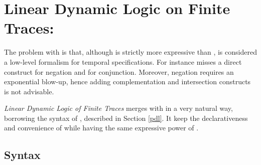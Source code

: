\section{Linear Dynamic Logic on Finite Traces: \LDLf}
The problem with \RE is that, although is strictly more expressive than \LTLf, is considered a low-level formalism for temporal specifications. For instance \RE misses a direct construct for negation and for conjunction. Moreover, negation requires an exponential blow-up, hence adding complementation and intersection constructs is not advisable.

\emph{Linear Dynamic Logic of Finite Traces} \LDLf \citep{de2013linear} merges \LTLf with \RE in a very natural way, borrowing the syntax of \PDL, described in Section \ref{pdl}. It keep the declarativeness and convenience of \LTLf while having the same expressive power of \RE. 

\subsection{Syntax}\label{ldlf-syntax}

